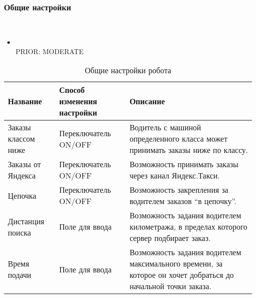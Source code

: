     \subsubsection{Общие настройки} \label{driver_app_robot_tab_general_settings} \mbox{}\\

      \begin{itemize}

        \item{
          \\
          PRIOR: MODERATE\\}

      \end{itemize}

      \begin{table}[h] 
        \begin{center}
        \caption {Общие настройки робота}
        \label{driver_app_robot_tab_table_general_settings}
        \setlength{\extrarowheight}{2mm}
        \begin{tabular}{|p{4cm}|p{3cm}|p{8cm}|}

          \hline     \textbf{Название}&\textbf{Способ изменения настройки}&\textbf{Описание} \\ [2mm]

          \hline   Заказы классом ниже & Переключатель ON/OFF & Водитель с машиной определенного класса может принимать заказы ниже по классу.\\ [2mm]

          \hline   Заказы от Яндекса & Переключатель ON/OFF & Возможность принимать заказы через канал Яндекс.Такси. \\ [2mm]
            
          \hline   Цепочка & Переключатель ON/OFF & Возможность закрепления за водителем заказов “в цепочку”. \\ [2mm]

          \hline   Дистанция поиска & Поле для ввода & Возможность задания водителем километража, в пределах которого сервер подбирает заказ. \\ [2mm]

          \hline   Время подачи & Поле для ввода & Возможность задания водителем максимального времени, за которое он хочет добраться до начальной точки заказа. \\ [2mm]

          \hline
        \end{tabular}
        \end{center}
      \end{table}

